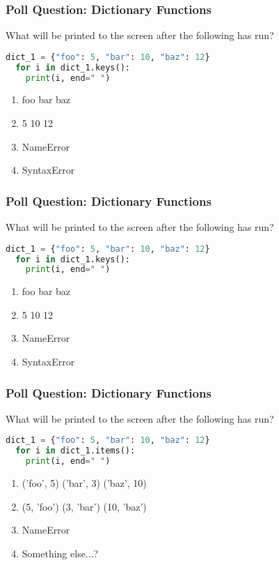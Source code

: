 \documentclass{beamer}
\begin{document}
%
%
\begin{frame}[fragile]
  \frametitle{Poll Question: Dictionary Functions}
  What will be printed to the screen after the following has run?
  \begin{lstlisting}[language=Python, autogobble]
  dict_1 = {"foo": 5, "bar": 10, "baz": 12}
  for i in dict_1.keys():
    print(i, end=" ")
  \end{lstlisting}
  \vfill
  \begin{enumerate}[A]
    \item foo bar baz
    \item 5 10 12 
    \item NameError
    \item SyntaxError
  \end{enumerate}
\end{frame}

%
%
\begin{frame}[fragile]
  \frametitle{Poll Question: Dictionary Functions}
  What will be printed to the screen after the following has run?
  \begin{lstlisting}[language=Python, autogobble]
  dict_1 = {"foo": 5, "bar": 10, "baz": 12}
  for i in dict_1.keys():
    print(i, end=" ")
  \end{lstlisting}
  \vfill
  \begin{enumerate}[A]
    \item foo bar baz
    \item 5 10 12 
    \item NameError
    \item SyntaxError
  \end{enumerate}
\end{frame}

%
%
\begin{frame}[fragile]
  \frametitle{Poll Question: Dictionary Functions}
  What will be printed to the screen after the following has run?
  \begin{lstlisting}[language=Python, autogobble]
  dict_1 = {"foo": 5, "bar": 10, "baz": 12}
  for i in dict_1.items():
    print(i, end=" ")
  \end{lstlisting}
  \vfill
  \begin{enumerate}[A]
    \item ('foo', 5) ('bar', 3) ('baz', 10)
    \item (5, 'foo') (3, 'bar') (10, 'baz')
    \item NameError
    \item Something else...?
  \end{enumerate}
\end{frame}
\end{document}
